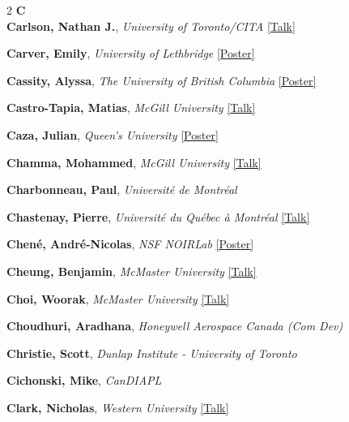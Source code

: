 \begin{small}
\begin{multicols}{2}
{\sffamily\bfseries\color{cascablue}\large C}\\[2pt]

\textbf{Carlson, Nathan J.}, {\footnotesize\textit{University of Toronto/CITA}} \hyperref[abstract-page-talk-293]{\scriptsize\textcolor{cascablue}{[Talk]}}\par
\textbf{Carver, Emily}, {\footnotesize\textit{University of Lethbridge}} \hyperref[poster-abstract-page-talk-207]{\scriptsize\textcolor{cascateal}{[Poster]}}\par
\textbf{Cassity, Alyssa}, {\footnotesize\textit{The University of British Columbia}} \hyperref[poster-abstract-page-talk-277]{\scriptsize\textcolor{cascateal}{[Poster]}}\par
\textbf{Castro-Tapia, Matias}, {\footnotesize\textit{McGill University}} \hyperref[abstract-page-talk-137]{\scriptsize\textcolor{cascablue}{[Talk]}}\par
\textbf{Caza, Julian}, {\footnotesize\textit{Queen's University}} \hyperref[poster-abstract-page-talk-89]{\scriptsize\textcolor{cascateal}{[Poster]}}\par
\textbf{Chamma, Mohammed}, {\footnotesize\textit{McGill University}} \hyperref[abstract-page-talk-140]{\scriptsize\textcolor{cascablue}{[Talk]}}\par
\textbf{Charbonneau, Paul}, {\footnotesize\textit{Université de Montréal}}\par
\textbf{Chastenay, Pierre}, {\footnotesize\textit{Université du Québec à Montréal}} \hyperref[abstract-page-talk-3]{\scriptsize\textcolor{cascablue}{[Talk]}}\par
\textbf{Chené, André-Nicolas}, {\footnotesize\textit{NSF NOIRLab}} \hyperref[poster-abstract-page-talk-286]{\scriptsize\textcolor{cascateal}{[Poster]}}\par
\textbf{Cheung, Benjamin}, {\footnotesize\textit{McMaster University}} \hyperref[abstract-page-talk-260]{\scriptsize\textcolor{cascablue}{[Talk]}}\par
\textbf{Choi, Woorak}, {\footnotesize\textit{McMaster University}} \hyperref[abstract-page-talk-160]{\scriptsize\textcolor{cascablue}{[Talk]}}\par
\textbf{Choudhuri, Aradhana}, {\footnotesize\textit{Honeywell Aerospace Canada (Com Dev)}}\par
\textbf{Christie, Scott}, {\footnotesize\textit{Dunlap Institute - University of Toronto}}\par
\textbf{Cichonski, Mike}, {\footnotesize\textit{CanDIAPL}}\par
\textbf{Clark, Nicholas}, {\footnotesize\textit{Western University}} \hyperref[abstract-page-talk-113]{\scriptsize\textcolor{cascablue}{[Talk]}}\par

\end{multicols}
\end{small}
